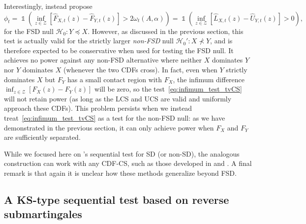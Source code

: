 \documentclass[12pt,twoside]{article}
\theoremstyle{plain}
\theoremstyle{definition}
\theoremstyle{remark}
\newcommand{\inparen}[1]{\left(#1\right)}
\newcommand{\insquare}[1]{\left[#1\right]}
\DeclareMathOperator*{\indsymb}{\mathds{1}}
\newcommand{\indicator}[1]{\indsymb\inparen{#1}}
\newcommand{\calH}{\mathcal{H}}
\newcommand{\calZ}{\mathcal{Z}}
\newcommand{\sd}{\preceq}
\begin{document}
Interestingly, \citet[Corollary S3]{howard2022sequential} instead propose 
\begin{equation}\label{eq:infimum_test_tvCS}
    \phi_t = \indicator{\inf_{z \in \calZ} \insquare{\hat{F}_{X,t}(z) - \hat{F}_{Y,t}(z)} > 2\omega_t(A, \alpha)}=\indicator{ \inf_{z \in \calZ} \insquare{\hat{L}_{X,t}(z) - \hat{U}_{Y,t}(z)} > 0},
\end{equation}
for the FSD null $\calH_0: Y \sd X$. However, as discussed in the previous section, this test is actually valid for the strictly larger \emph{non-FSD} null $\calH_0': X \not\prec Y$, and is therefore expected to be conservative when used for testing the FSD null. 
It achieves no power against any non-FSD alternative where neither $X$ dominates $Y$ nor $Y$ dominates $X$ (whenever the two CDFs cross). 
In fact, even when $Y$ strictly dominates $X$ but $F_Y$ has a small contact region with $F_X$, the infimum difference $\inf_{z \in \calZ} [F_X(z) - F_Y(z)]$ will be zero, so the test~\eqref{eq:infimum_test_tvCS} will not retain power (as long as the LCS and UCS are valid and uniformly approach these CDFs). 
This problem persists when we instead treat~\eqref{eq:infimum_test_tvCS} as a test for the non-FSD null: as we have demonstrated in the previous section, it can only achieve power when $F_X$ and $F_Y$ are sufficiently separated. 

While we focused here on \citet{howard2022sequential}'s sequential test for SD (or non-SD), the analogous construction can work with any CDF-CS, such as those developed in \citet{mineiro2023nonstationarity} and \citet{clerico2026uniform}.
A final remark is that again it is unclear how these methods generalize beyond FSD.


\subsection{A KS-type sequential test based on reverse submartingales}\label{sec:ks_test_from_reverse_submtg}
\end{document}
